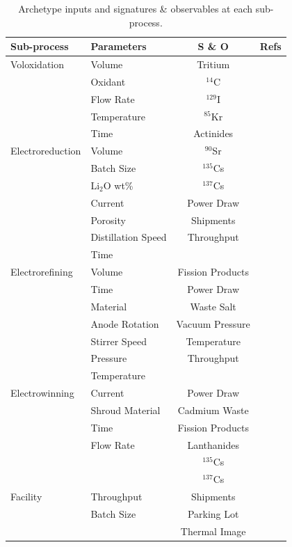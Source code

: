 \documentclass{anstrans}
\begin{document}
\begin{table}[h]
	\centering
	\begin{tabularx}{0.5\textwidth}{llcr}
		\hline
		\textbf{Sub-process} & \textbf{Parameters} & \textbf{S \& O} & \textbf{Refs} \\
		\hline
		Voloxidation & Volume & Tritium & \cite{jubin_spent_2009} \\
		& Oxidant & $^{14}$C & \cite{flowsheet_1998} \\
		& Flow Rate &  $^{129}$I &  \\
		& Temperature & $^{85}$Kr &  \\
		& Time & Actinides & \\ \hline
		Electroreduction & Volume & $^{90}$Sr & \cite{Borrelli_2017} \\
		& Batch Size & $^{135}$Cs & \cite{flowsheet_1998} \\
		& Li$_2$O wt\% & $^{137}$Cs & \cite{choi_electrochemical_2015} \\
		& Current & Power Draw & \cite{lee_korean_2011} \\
		& Porosity & Shipments & \cite{lee_modeling_2016} \\
		& Distillation Speed & Throughput & \\ 
		& Time & & \\ \hline
		Electrorefining & Volume & Fission Products & \cite{lee_advanced_2008} \\
		& Time & Power Draw & \cite{lee_korean_2011} \\
		& Material & Waste Salt & \cite{flowsheet_1998} \\
		& Anode Rotation & Vacuum Pressure & \cite{koyama_development_2012} \\
		& Stirrer Speed & Temperature & \cite{kim_development_2013} \\
		& Pressure & Throughput & \\
		& Temperature & & \\ \hline
		Electrowinning & Current & Power Draw & \cite{flowsheet_1998} \\
		& Shroud Material & Cadmium Waste & \cite{lee_korean_2011} \\
		& Time & Fission Products & \cite{Borrelli_2017} \\
		& Flow Rate & Lanthanides & \\
		&  & $^{135}$Cs & \\
		&  & $^{137}$Cs & \\ \hline
		Facility & Throughput & Shipments & \\
		& Batch Size & Parking Lot & \\
		& & Thermal Image & \\
		\hline
	\end{tabularx}
	\caption {Archetype inputs and signatures \& observables at each sub-process.}
	\label {tab:params}
\end{table}
\end{document}
